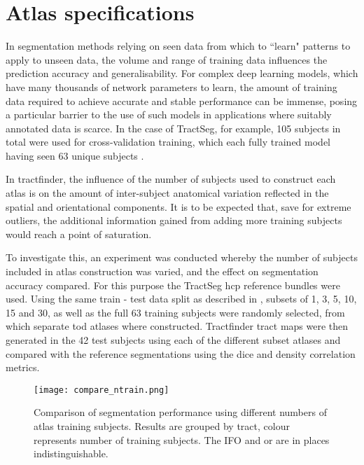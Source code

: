 \section{Atlas specifications}


In segmentation methods relying on seen data from which to ``learn" patterns to apply to unseen data, the volume and range of training data influences the prediction accuracy and generalisability. 
For complex deep learning models, which have many thousands of network parameters to learn, the amount of training data required to achieve accurate and stable performance can be immense, posing a particular barrier to the use of such models in applications where suitably annotated data is scarce.
In the case of TractSeg, for example, 105 subjects in total were used for cross-validation training, which each fully trained model having seen 63 unique subjects .

In tractfinder, the influence of the number of subjects used to construct each atlas is on the amount of inter-subject anatomical variation reflected in the spatial and orientational components.
It is to be expected that, save for extreme outliers, the additional information gained from adding more training subjects would reach a point of saturation.

To investigate this, an experiment was conducted whereby the number of subjects included in atlas construction was varied, and the effect on segmentation accuracy compared.
For this purpose the TractSeg \gls{hcp} reference bundles were used.
Using the same train - test data split as described in , subsets of 1, 3, 5, 10, 15 and 30, as well as the full 63 training subjects were randomly selected, from which separate \gls{tod} atlases where constructed.
Tractfinder tract maps were then generated in the 42 test subjects using each of the different subset atlases and compared with the reference segmentations using the \gls{dice} and density correlation metrics.

\begin{figure}
    \texttt{[image: compare\_ntrain.png]}
    \caption{Comparison of segmentation performance using different numbers of atlas training subjects. Results are grouped by tract, colour represents number of training subjects. The IFO and \gls{or} are in places indistinguishable. }
    \label{fig:ntrain}
\end{figure}

